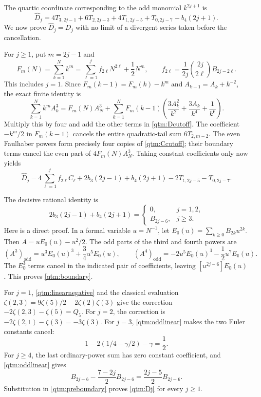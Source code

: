 \documentclass[11pt,a4paper]{article}
\numberwithin{equation}{section}
\theoremstyle{plain}
\theoremstyle{definition}
\theoremstyle{remark}
\begin{document}
The quartic coordinate corresponding to the odd monomial $k^{2j+1}$ is
\begin{equation}\label{qtm:Dcutoff}
 \widehat D_j=4T_{3,2j-1}+6T_{2,2j-3}
              +4T_{1,2j-5}+T_{0,2j-7}+b_4(2j+1).
\end{equation}
We now prove $\widehat D_j=D_j$ with no limit of a divergent
series taken before the cancellation.

For $j\ge1$, put $m=2j-1$ and
\begin{equation}\label{qtm:Faulhaber}
 F_m(N)=\sum_{k=1}^Nk^m
   =\sum_{\ell=1}^j f_{2\ell}N^{2\ell}+\frac12N^m,
 \qquad
 f_{2\ell}=\frac1{2j}\binom{2j}{2\ell}B_{2j-2\ell}.
\end{equation}
This includes $j=1$.  Since $F_m(k-1)=F_m(k)-k^m$ and
$A_{k-1}=A_k+k^{-2}$, the exact finite identity is
\begin{equation}\label{qtm:cubicSBP}
 \sum_{k=1}^Nk^m A_k^3
 =F_m(N)A_N^3+
 \sum_{k=1}^NF_m(k-1)
       \left(\frac{3A_k^2}{k^2}+\frac{3A_k}{k^4}+\frac1{k^6}\right).
\end{equation}
Multiply this by four and add the other terms in
\eqref{qtm:Dcutoff}.  The coefficient $-k^m/2$ in $F_m(k-1)$
cancels the entire quadratic-tail sum $6T_{2,m-2}$.  The even
Faulhaber powers form precisely four copies of
\eqref{qtm:Ccutoff}; their boundary terms cancel the even part of
$4F_m(N)A_N^3$.  Taking constant coefficients only now yields
\begin{equation}\label{qtm:preboundary}
 \widehat D_j=
 4\sum_{\ell=1}^j f_{2\ell}C_\ell
 +2b_3(2j-1)+b_4(2j+1)
 -2T_{1,2j-5}-T_{0,2j-7}.
\end{equation}

The decisive rational identity is
\begin{equation}\label{qtm:boundary}
 2b_3(2j-1)+b_4(2j+1)=
 \begin{cases}0,&j=1,2,\\B_{2j-6},&j\ge3.\end{cases}
\end{equation}
Here is a direct proof.  In a formal variable $u=N^{-1}$, let
$E_0(u)=\sum_{k\ge0}B_{2k}u^{2k}$.  Then
$A=uE_0(u)-u^2/2$.  The odd parts of the third and fourth powers are
\[
 (A^3)_{\mathrm{odd}}=u^3E_0(u)^3+\frac34u^5E_0(u),\qquad
 (A^4)_{\mathrm{odd}}=-2u^5E_0(u)^3-\frac12u^7E_0(u).
\]
The $E_0^3$ terms cancel in the indicated pair of coefficients,
leaving $[u^{2j-6}]E_0(u)$.  This proves \eqref{qtm:boundary}.

For $j=1$, \eqref{qtm:linearnegative} and the classical evaluation
$\zeta(2,3)=9\zeta(5)/2-2\zeta(2)\zeta(3)$ give the correction
$-2\zeta(2,3)-\zeta(5)=Q_5$.  For $j=2$, the correction is
$-2\zeta(2,1)-\zeta(3)=-3\zeta(3)$.  For $j=3$,
\eqref{qtm:oddlinear} makes the two Euler constants cancel:
\[
 1-2(1/4-\gamma/2)-\gamma=\frac12.
\]
For $j\ge4$, the last ordinary-power sum has zero constant
coefficient, and \eqref{qtm:oddlinear} gives
\[
 B_{2j-6}-\frac{7-2j}{2}B_{2j-6}
       =\frac{2j-5}{2}B_{2j-6}.
\]
Substitution in \eqref{qtm:preboundary} proves
\eqref{qtm:Dj} for every $j\ge1$.
\end{document}
